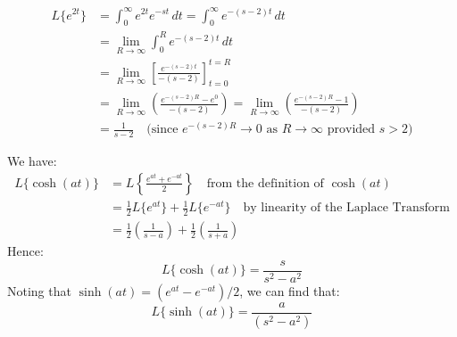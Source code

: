 \documentclass[a4paper, 10pt]{article}
\begin{document}
\begin{examplebox}[ Find the Laplace Transform of $f(t) = e^{2t}$]
  \begin{align*}
    L\{e^{2t}\}
     & = \int_0^\infty e^{2t}e^{-st}\, dt
    = \int_0^\infty e^{-(s-2)t}\, dt                                                                               \\[1mm]
     & = \lim_{R\to\infty} \int_0^R e^{-(s-2)t}\, dt                                                               \\[1mm]
     & = \lim_{R\to\infty} \left[ \frac{e^{-(s-2)t}}{-(s-2)} \right]_{t=0}^{t=R}                                   \\[1mm]
     & = \lim_{R\to\infty} \left( \frac{e^{-(s-2)R} - e^0}{-(s-2)} \right)
    = \lim_{R\to\infty} \left( \frac{e^{-(s-2)R} - 1}{-(s-2)} \right)                                              \\[1mm]
     & = \frac{1}{s-2} \quad \text{(since } e^{-(s-2)R} \to 0 \text{ as } R\to\infty \text{ provided } s>2\text{)}
  \end{align*}
\end{examplebox}

\begin{examplebox}[Find the Laplace Transform of $f(t) = \cosh(at)$]
  We have:
  \begin{align*}
    L\{\cosh(at)\} & = L\left\{ \frac{e^{at} + e^{-at}}{2}\right\} \quad \text{from the definition of }\cosh(at)           \\
                   & = \frac{1}{2}L\{e^{at}\} + \frac{1}{2}L\{e^{-at}\} \quad \text{by linearity of the Laplace Transform} \\
                   & = \frac{1}{2}\left(\frac{1}{s-a}\right) + \frac{1}{2}\left(\frac{1}{s+a}\right)
  \end{align*}
  Hence:
  $$L\{\cosh(at)\} = \frac{s}{s^2 - a^2}$$
  Noting that $\sinh(at) = (e^{at} - e^{-at})/2$, we can find that:
  $$L\{\sinh(at)\} = \frac{a}{(s^2 - a^2)}$$
\end{examplebox}
\end{document}
